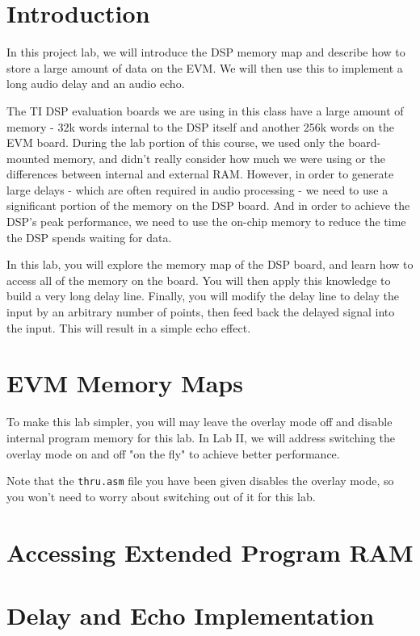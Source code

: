 \documentclass[11pt]{handout}
\begin{document}
\setlength{\baselineskip}{0.5cm}
\setlength{\parskip}{0.5cm}

\makeboxtitle
\vspace{0.3cm}

\section{Introduction}

In this project lab, we will introduce the DSP memory
map and describe how to store a large amount of data on the EVM.
We will then use this to implement a long audio delay and an
audio echo.

The TI DSP evaluation boards we are using in this class have a large
amount of memory - 32k words internal to the DSP itself and
another 256k words on the EVM board. During the lab portion 
of this course, we used only
the board-mounted memory, and didn't really consider how much
we were using or the differences between internal and external RAM.
However, in order to generate large delays - which are often required in 
audio processing - we need to use a significant portion of the
memory on the DSP board. And in order to achieve the DSP's peak 
performance, we need to use the on-chip memory to reduce the time
the DSP spends waiting for data.

In this lab, you will explore the memory map of the DSP board,
and learn how to access all of the memory on the board. You will
then apply this knowledge to build a very long delay line. Finally,
you will modify the delay line to delay the input by an arbitrary
number of points, then feed back the delayed signal into the input.
This will result in a simple echo effect.

\section{EVM Memory Maps}



To make this lab simpler, you will
may leave the overlay mode off and disable internal program memory for
this lab. In Lab II, we will address switching the overlay mode on
and off "on the fly" to achieve better performance.

Note that the \verb+thru.asm+ file you have been given disables the
overlay mode, so you won't need to worry about switching out of it
for this lab.

\section{Accessing Extended Program RAM}



\section{Delay and Echo Implementation}


\end{document}
